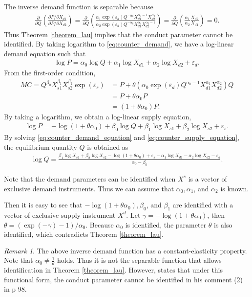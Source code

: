 \documentclass[11pt, a4paper]{article}
\theoremstyle{remark}
\newtheorem{remark}{Remark}
\begin{document}
The inverse demand function is separable because
\begin{align}
    \frac{\partial }{\partial Q} \left(\frac{\partial P/\partial X_{d1}}{\partial P/\partial X_{d2}} \right) = \frac{\partial }{\partial Q} \left(\frac{\alpha_{1}\exp(\varepsilon_{d}) Q^{-\alpha_0} X_{d1}^{\alpha_1-1}X_{d2}^{\alpha_2}}{\alpha_2\exp(\varepsilon_{d}) Q^{-\alpha_0} X_{d1}^{\alpha_1}X_{d2}^{\alpha_2-1}} \right) =  \frac{\partial }{\partial Q}\left(\frac{\alpha_1}{\alpha_2} \frac{X_{d2}}{X_{d1}} \right)=0.
\end{align}
Thus Theorem \ref{theorem_lau} implies that the conduct parameter cannot be identified.
By taking logarithm to \eqref{eq:counter_demand}, we have a log-linear demand equation such that 
\begin{align}
    \log P = \alpha_0 \log Q + \alpha_1 \log X_{d1}  + \alpha_2 \log X_{d2} + \varepsilon_{d}.\label{eq:counter_demand_equation}
\end{align}
From the first-order condition, 
\begin{align}
    MC = Q^{\beta_0} X_{s1}^{\beta_1}X_{s2}^{\beta_2}\exp(\varepsilon_{s}) & = P + \theta (\alpha_0 \exp(\varepsilon_{d})Q^{\alpha_0-1}X_{d1}^{\alpha_1}X_{d2}^{\alpha_2}) Q\\
    & = P + \theta \alpha_0 P\\
    &= (1 + \theta\alpha_0) P.
\end{align}
By taking a logarithm, we obtain a log-linear supply equation,
\begin{align}
    \log P = - \log(1 + \theta\alpha_0) + \beta_0 \log Q + \beta_1 \log X_{s1}+\beta_2 \log X_{s2} + \varepsilon_{s}.\label{eq:counter_supply_equation}
\end{align}
By solving \eqref{eq:counter_demand_equation} and \eqref{eq:counter_supply_equation}, the equilibrium quantity $Q$ is obtained as
\begin{align}
    \log Q = \frac{\beta_1 \log X_{s1}+\beta_2 \log X_{s2} - \log(1 + \theta\alpha_0)+ \varepsilon_{s} - \alpha_1 \log X_{d1}  - \alpha_2 \log X_{d2} - \varepsilon_{d} }{\alpha_0 - \beta_0}.
\end{align}

Note that the demand parameters can be identified when $X^s$ is a vector of exclusive demand instruments.
Thus we can assume that $\alpha_0, \alpha_1$, and $\alpha_2$ is known.  

Then it is easy to see that $- \log(1 + \theta\alpha_0), \beta_0$, and $\beta_1$ are identified with a vector of exclusive supply instrument $X^d$.
Let $\gamma = - \log(1 + \theta\alpha_0)$, then $\theta = (\exp(-\gamma) - 1)/\alpha_0$.
Because $\alpha_0$ is identified, the parameter $\theta$ is also identified, which contradicts Theorem \ref{theorem_lau}.
\begin{remark}
    The above inverse demand function has a constant-elasticity property. 
    Note that $\alpha_0 \ne \frac{1}{\theta}$ holds.
    Thus it is not the separable function that allows identification in Theorem \ref{theorem_lau}.
    However, \citet{lau1982identifying} states that under this functional form, the conduct parameter cannot be identified in his comment (2) in p 98.
\end{remark}
\end{document}
